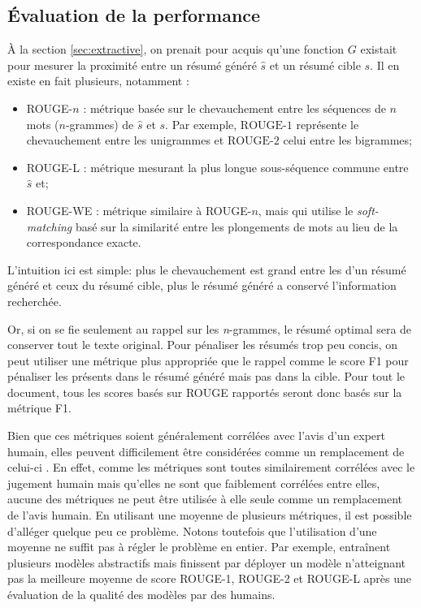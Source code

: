 \subsection{Évaluation de la performance}
\label{sec:rouge}

À la section \ref{sec:extractive}, on prenait pour acquis qu'une fonction $G$ existait
pour mesurer la proximité entre un résumé généré $\hat{s}$ et un résumé cible $s$.
Il en existe en fait plusieurs, notamment :

\begin{itemize}
    \item ROUGE-$n$ \citep{lin-2004-rouge}: métrique basée sur le chevauchement entre les séquences de $n$ mots ($n$-grammes)
          de $\hat{s}$ et $s$. Par exemple, $\text{ROUGE-1}$ représente le chevauchement entre les unigrammes
          et $\text{ROUGE-2}$ celui entre les bigrammes;
    \item ROUGE-L \citep{lin-2004-rouge}: métrique mesurant la plus longue sous-séquence commune
          entre $\hat{s}$ et;
    \item ROUGE-WE \citep{ng-abrecht-2015-better}: métrique similaire à ROUGE-$n$, mais qui utilise
          le \textit{soft-matching} basé sur la similarité entre les plongements de mots au lieu
          de la correspondance exacte.
\end{itemize}
L'intuition ici est simple: plus le chevauchement est grand entre les 
\ngrams d'un résumé généré et ceux du résumé cible, plus le résumé
généré a conservé l'information recherchée.

Or, si on se fie seulement au rappel sur les \textit{n}-grammes, le résumé optimal sera
de conserver tout le texte original. 
Pour pénaliser les résumés trop peu concis, on peut utiliser une métrique plus
appropriée que le rappel comme le score F1 pour pénaliser les 
\ngrams présents dans le résumé généré mais pas dans la cible.
Pour tout le document, tous les scores basés sur ROUGE rapportés seront donc 
basés sur la métrique F1.

Bien que ces métriques soient généralement
corrélées avec l'avis d'un expert humain, elles peuvent difficilement être considérées
comme un remplacement de celui-ci \citep{peyrard-2019-studying}.
En effet, comme les métriques sont toutes similairement corrélées avec le jugement humain
mais qu'elles ne sont que faiblement corrélées entre elles, aucune des métriques
ne peut être utilisée à elle seule comme un remplacement de l'avis humain.
En utilisant une moyenne de plusieurs métriques, il est possible d'alléger quelque peu
ce problème.
Notons toutefois que l'utilisation d'une moyenne ne suffit pas à régler le problème
en entier.
Par exemple, \citet{DBLP:journals/corr/PaulusXS17} entraînent 
plusieurs modèles abstractifs mais finissent par déployer un modèle n'atteignant
pas la meilleure moyenne de score ROUGE-1, ROUGE-2 et ROUGE-L après
une évaluation de la qualité des modèles par des humains.


